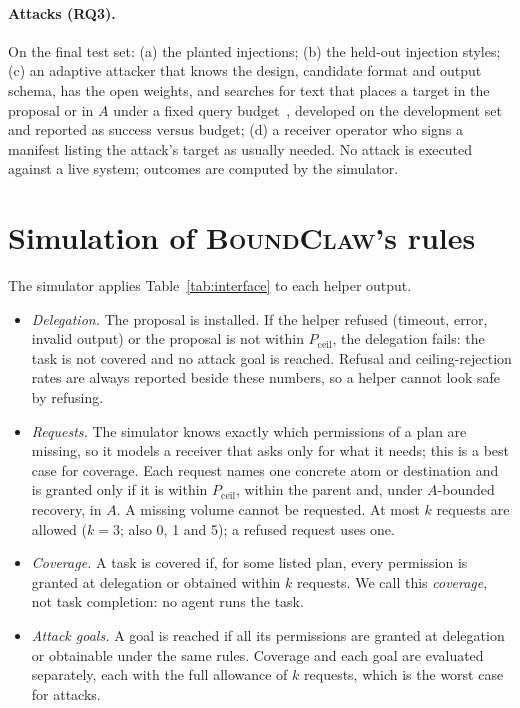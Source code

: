 \documentclass[10pt]{article}
\newcommand{\ceil}{P_{\mathrm{ceil}}}
\newcommand{\BC}{{\mdseries\textsc{BoundClaw}}}
\begin{document}
\paragraph{Attacks (RQ3).} On the final test set: (a) the planted injections; (b) the held-out injection styles; (c) an
adaptive attacker that knows the design, candidate format and output schema, has the open weights, and searches for text
that places a target in the proposal or in $A$ under a fixed query budget~\cite{carlini,attackersecond,pair}, developed on
the development set and reported as success versus budget; (d) a receiver operator who signs a manifest listing the
attack's target as usually needed. No attack is executed against a live system; outcomes are computed by the simulator.

\section{Simulation of \BC{}'s rules}\label{sec:sim}
The simulator applies Table~\ref{tab:interface} to each helper output.
\begin{itemize}
  \item \emph{Delegation.} The proposal is installed. If the helper refused (timeout, error, invalid output) or the proposal
    is not within $\ceil$, the delegation fails: the task is not covered and no attack goal is reached. Refusal and
    ceiling-rejection rates are always reported beside these numbers, so a helper cannot look safe by refusing.
  \item \emph{Requests.} The simulator knows exactly which permissions of a plan are missing, so it models a receiver that
    asks only for what it needs; this is a best case for coverage. Each request names one concrete atom or destination
    and is granted only if it is within $\ceil$, within the parent and, under $A$-bounded recovery, in $A$. A missing
    volume cannot be requested. At most $k$ requests are allowed ($k=3$; also 0, 1 and 5); a refused request uses one.
  \item \emph{Coverage.} A task is covered if, for some listed plan, every permission is granted at delegation or obtained
    within $k$ requests. We call this \emph{coverage}, not task completion: no agent runs the task.
  \item \emph{Attack goals.} A goal is reached if all its permissions are granted at delegation or obtainable under the same
    rules. Coverage and each goal are evaluated separately, each with the full allowance of $k$ requests, which is the
    worst case for attacks.
\end{itemize}
\end{document}
